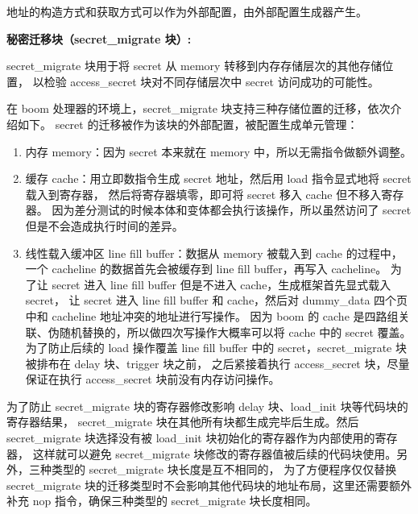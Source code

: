 地址的构造方式和获取方式可以作为外部配置，由外部配置生成器产生。\par

\textbf{秘密迁移块（secret\_migrate 块）:}\par
secret\_migrate 块用于将 secret 从 memory 转移到内存存储层次的其他存储位置，
以检验 access\_secret 块对不同存储层次中 secret 访问成功的可能性。\par

在 boom 处理器的环境上，secret\_migrate 块支持三种存储位置的迁移，依次介绍如下。
secret 的迁移被作为该块的外部配置，被配置生成单元管理：
\begin{enumerate}
    \item 内存 memory：因为 secret 本来就在 memory 中，所以无需指令做额外调整。\par
    \item 缓存 cache：用立即数指令生成 secret 地址，然后用 load 指令显式地将 secret 载入到寄存器，
然后将寄存器填零，即可将 secret 移入 cache 但不移入寄存器。
因为差分测试的时候本体和变体都会执行该操作，所以虽然访问了 secret 但是不会造成执行时间的差异。\par
    \item 线性载入缓冲区 line fill buffer：数据从 memory 被载入到 cache 的过程中，
    一个 cacheline 的数据首先会被缓存到 line fill buffer，再写入 cacheline。
    为了让 secret 进入 line fill buffer 但是不进入 cache，生成框架首先显式载入 secret，
    让 secret 进入 line fill buffer 和 cache，然后对 dummy\_data 四个页中和 cacheline 地址冲突的地址进行写操作。
    因为 boom 的 cache 是四路组关联、伪随机替换的，所以做四次写操作大概率可以将 cache 中的 secret 覆盖。
    为了防止后续的 load 操作覆盖 line fill buffer 中的 secret，secret\_migrate 块被排布在 delay 块、trigger 块之前，
    之后紧接着执行 access\_secret 块，尽量保证在执行 access\_secret 块前没有内存访问操作。\par
\end{enumerate}

为了防止 secret\_migrate 块的寄存器修改影响 delay 块、load\_init 块等代码块的寄存器结果，
secret\_migrate 块在其他所有块都生成完毕后生成。然后 secret\_migrate 块选择没有被 load\_init 块初始化的寄存器作为内部使用的寄存器，
这样就可以避免 secret\_migrate 块修改的寄存器值被后续的代码块使用。另外，三种类型的 secret\_migrate 块长度是互不相同的，
为了方便程序仅仅替换 secret\_migrate 块的迁移类型时不会影响其他代码块的地址布局，这里还需要额外补充 nop 指令，确保三种类型的 secret\_migrate 块长度相同。\par

